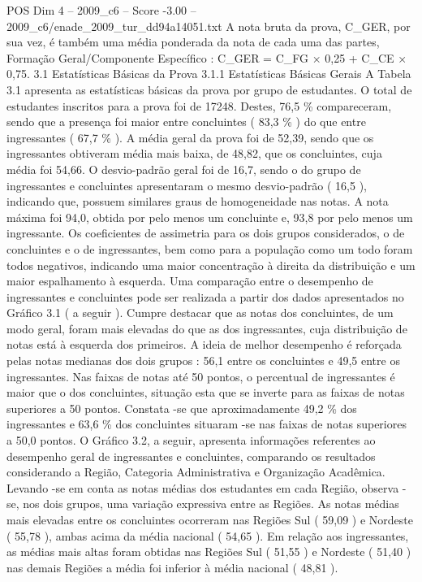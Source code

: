 \begin{textsample}{POS Dim 4 – 2009\_c6 – Score -3.00 – 2009\_c6/enade\_2009\_tur\_dd94a14051.txt}
A nota bruta da prova, C\_GER, por sua vez, é também uma média ponderada da nota de cada uma das partes, Formação Geral/Componente Específico : C\_GER = C\_FG × 0,25 + C\_CE × 0,75. 3.1 Estatísticas Básicas da Prova 3.1.1 Estatísticas Básicas Gerais A Tabela 3.1 apresenta as estatísticas básicas da prova por grupo de estudantes.
O total de estudantes inscritos para a prova foi de 17248.
Destes, 76,5 \% compareceram, sendo que a presença foi maior entre concluintes ( 83,3 \% ) do que entre ingressantes ( 67,7 \% ).
A média geral da prova foi de 52,39, sendo que os ingressantes obtiveram média mais baixa, de 48,82, que os concluintes, cuja média foi 54,66.
O desvio-padrão geral foi de 16,7, sendo o do grupo de ingressantes e concluintes apresentaram o mesmo desvio-padrão ( 16,5 ), indicando que, possuem similares graus de homogeneidade nas notas.
A nota máxima foi 94,0, obtida por pelo menos um concluinte e, 93,8 por pelo menos um ingressante.
Os coeficientes de assimetria para os dois grupos considerados, o de concluintes e o de ingressantes, bem como para a população como um todo foram todos negativos, indicando uma maior concentração à direita da distribuição e um maior espalhamento à esquerda.
Uma comparação entre o desempenho de ingressantes e concluintes pode ser realizada a partir dos dados apresentados no Gráfico 3.1 ( a seguir ).
Cumpre destacar que as notas dos concluintes, de um modo geral, foram mais elevadas do que as dos ingressantes, cuja distribuição de notas está à esquerda dos primeiros.
A ideia de melhor desempenho é reforçada pelas notas medianas dos dois grupos : 56,1 entre os concluintes e 49,5 entre os ingressantes.
Nas faixas de notas até 50 pontos, o percentual de ingressantes é maior que o dos concluintes, situação esta que se inverte para as faixas de notas superiores a 50 pontos.
Constata -se que aproximadamente 49,2 \% dos ingressantes e 63,6 \% dos concluintes situaram -se nas faixas de notas superiores a 50,0 pontos.
O Gráfico 3.2, a seguir, apresenta informações referentes ao desempenho geral de ingressantes e concluintes, comparando os resultados considerando a Região, Categoria Administrativa e Organização Acadêmica.
Levando -se em conta as notas médias dos estudantes em cada Região, observa -se, nos dois grupos, uma variação expressiva entre as Regiões.
As notas médias mais elevadas entre os concluintes ocorreram nas Regiões Sul ( 59,09 ) e Nordeste ( 55,78 ), ambas acima da média nacional ( 54,65 ).
Em relação aos ingressantes, as médias mais altas foram obtidas nas Regiões Sul ( 51,55 ) e Nordeste ( 51,40 ) nas demais Regiões a média foi inferior à média nacional ( 48,81 ).

\end{textsample}
